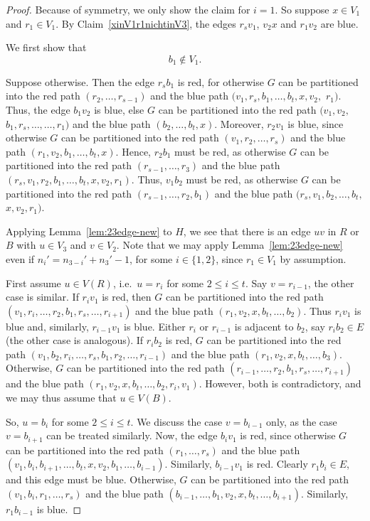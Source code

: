 \documentclass[a4paper,10pt]{article}
\begin{document}
\begin{proof}
Because of symmetry, we only show the claim for $i=1$. So suppose $x\in V_1$ and  $r_1\in V_{1}$.
By Claim~\ref{xinV1r1nichtinV3}, the edges $r_sv_1$, $v_2x$ and  $r_1v_2$ are blue.

We first show that
\begin{equation}\label{b1noestaenV1}
 \text{$b_1 \notin V_1$.}
 \end{equation}

Suppose otherwise.
Then the edge $r_sb_1$ is red, for otherwise $G$ can be partitioned into the red path $(r_2,\ldots,r_{s-1})$ and the blue path $(v_1,r_s,b_1,\ldots,b_t,x,v_2,$ $r_1)$.
Thus, the edge $b_1v_2$ is blue, else $G$ can be partitioned into the red path $(v_1,v_2,$ $b_1,r_s,\ldots,\ldots,r_1)$ and the blue path $(b_2,\ldots,b_t,x)$.
Moreover, $r_2v_1$ is blue, since otherwise $G$ can be partitioned into the red path $(v_1,r_2,\ldots,r_s)$ and the blue path $(r_1,v_2,b_1,\ldots,b_t,x)$.
Hence, $r_2b_1$ must be red, as otherwise $G$ can be partitioned into the red path $(r_{s-1},\ldots,r_3)$ and the blue path $(r_s,v_1,r_2,b_1,\ldots,b_t,x,v_2,r_1)$.
Thus, $v_1b_2$ must be red, as otherwise $G$ can be partitioned into the red path $(r_{s-1},\ldots,r_2,b_1)$ and the blue path $(r_s,v_1,b_2,\ldots,b_t,$ $x,v_2,r_1)$.

Applying Lemma~\ref{lem:23edge-new} to $H$, we see that there is an edge $uv$ in $R$ or $B$ with $u \in V_3$ and $v \in V_2$.
Note that we may apply Lemma~\ref{lem:23edge-new} even if $n_i'=n_{3-i}'+n_3'-1$, for some $i \in \{1,2\}$, since $r_1 \in V_1$ by assumption.

First assume ${u \in V(R)}$, i.e.~$u = r_i$ for some $2 \le i \le t$.
Say $v = r_{i-1}$, the other case is similar.
If $r_iv_1$ is red, then $G$ can be partitioned into the red path $(v_1,r_i,\ldots,r_2,b_1,r_s,\ldots,r_{i+1})$ and the blue path $(r_1,v_2,x,b_t,\ldots,b_2)$.
Thus $r_iv_1$ is blue and, similarly, $r_{i-1}v_1$ is blue.
Either $r_i$ or $r_{i-1}$ is adjacent to $b_2$, say $r_ib_2 \in E$ (the other case is analogous).
If $r_ib_2$ is red, $G$ can be partitioned into the red path $(v_1,b_2,r_i,\ldots,r_s,b_1,r_2,\ldots,r_{i-1})$ and the blue path $(r_1,v_2,x,b_t,\ldots,b_3)$.
Otherwise, $G$ can be partitioned into the red path $(r_{i-1},\ldots,r_2,b_1,r_s,\ldots,r_{i+1})$ and the blue path $(r_1,v_2,x,b_t,\ldots,b_2,r_i,v_1)$.
However, both is contradictory, and we may thus assume that $u \in V(B)$.

So, $u = b_i$ for some $2 \le i \le t$.
We discuss the case $v = b_{i-1}$ only, as the case $v = b_{i+1}$ can be treated similarly.
Now, the edge $b_iv_1$ is red, since otherwise $G$ can be partitioned into the red path $(r_1,\ldots,r_s)$ and the blue path $(v_1,b_i,b_{i+1},\ldots,b_t,x,v_2,b_1,\ldots,b_{i-1})$.
Similarly, $b_{i-1}v_1$ is red.
Clearly $r_1b_i \in E$, and this edge must be blue.
Otherwise, $G$ can be partitioned into the red path $(v_1,b_i,r_1,\ldots,r_s)$ and the blue path $(b_{i-1},\ldots,b_1,v_2,x,b_t,\ldots,b_{i+1})$.
Similarly, $r_1b_{i-1}$ is blue.


\end{proof}
\end{document}
